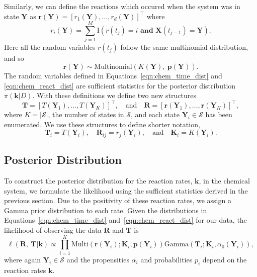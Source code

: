 \documentclass[final]{siamltex}
\begin{document}
Similarly, we can define the reactions which occured when the system was in state $\mathbf{Y}$ as $\mathbf{r}(\mathbf{Y}) = [r_1(\mathbf{Y}), \ldots, r_d(\mathbf{Y})]^\top$ where
\[
	r_i(\mathbf{Y}) = \sum\limits_{j=1}^M \text{I}(r(t_j) = i \textbf{ and }\mathbf{X}(t_{j-1}) = \mathbf{Y}).
\]
Here all the random variables $r(t_j)$ follow the same multinomial distribution, and so
\begin{equation}\label{eqn:chem_react_dist}
	\mathbf{r}(\mathbf{Y}) \sim \text{Multinomial}(K(\mathbf{Y}),~\mathbf{p}(\mathbf{Y})). 
\end{equation}
The random variables defined in Equations~\eqref{eqn:chem_time_dist} and \eqref{eqn:chem_react_dist} are sufficient statistics for the posterior distribution $\pi(\mathbf{k}|D)$. With these definitions we define two new structures
\[
	\mathbf{T} = [T(\mathbf{Y}_1), \dots, T(\mathbf{Y}_K)]^\top, \quad \text{and} \quad \mathbf{R} = [\mathbf{r}(\mathbf{Y}_1), \dots, \mathbf{r}(\mathbf{Y}_K)]^\top,
\]
where $K = |\mathcal{S}|$, the number of states in $\mathcal{S}$, and each state $\mathbf{Y}_i \in \mathcal{S}$ has been enumerated. We use these structures to define shorter notation,
\[
	\mathbf{T}_i = T(\mathbf{Y}_i), \quad \mathbf{R}_{ij} = r_j(\mathbf{Y}_i), \quad \text{and} \quad \mathbf{K}_i = K(\mathbf{Y}_i).
\]

\subsection{Posterior Distribution}\label{sec:chem_stoch_posterior}

To construct the posterior distribution for the reaction rates, $\mathbf{k}$, in the chemical system, we formulate the likelihood using the sufficient statistics derived in the previous section. Due to the positivity of these reaction rates, we assign a Gamma prior distribution to each rate. Given the distributions in Equations~\eqref{eqn:chem_time_dist} and~\eqref{eqn:chem_react_dist} for our data, the likelihood of observing the data $\mathbf{R}$ and $\mathbf{T}$ is
\[
	\ell(\mathbf{R},~ \mathbf{T}|\mathbf{k}) \propto \prod\limits_{i=1}^K \text{Multi}(\mathbf{r}(\mathbf{Y}_i); \mathbf{K}_i, \mathbf{p}(\mathbf{Y}_i))\text{Gamma}(\mathbf{T}_i; \mathbf{K}_i, \alpha_0(\mathbf{Y}_i)),
\]
where again $\mathbf{Y}_i \in \mathcal{S}$ and the propensities $\alpha_i$ and probabilities $p_i$ depend on the reaction rates $\mathbf{k}$.
\end{document}
